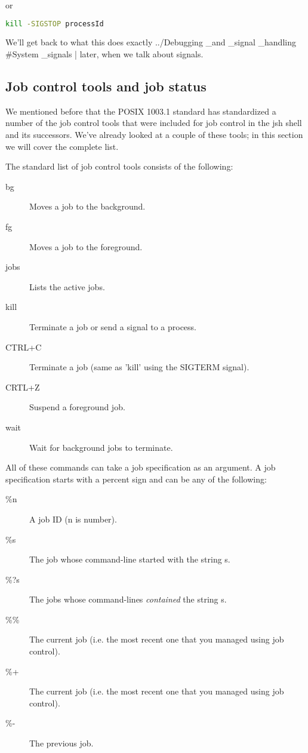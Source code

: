 or 
\lstset{basicstyle=\scriptsize, numbers=left, captionpos=b, tabsize=4}
\begin{lstlisting}[language={bash},
xleftmargin=15pt]
kill -SIGSTOP processId
\end{lstlisting}

We'll get back to what this does exactly
../Debugging \_and \_signal \_handling \#System \_signals | later, when we talk about
signals.

\subsection{Job control tools and job status}
We mentioned before that the POSIX 1003.1 standard has standardized a number of
the job control tools that were included for job control in the jsh shell and
its successors. We've already looked at a couple of these tools; in this
section we will cover the complete list.

The standard list of job control tools consists of the following:

\begin{description}
\item[bg]Moves a job to the background.
\item[fg]Moves a job to the foreground.
\item[jobs]Lists the active jobs.
\item[kill]Terminate a job or send a signal to a process.
\item[CTRL+C]Terminate a job (same as 'kill' using the SIGTERM signal).
\item[CRTL+Z]Suspend a foreground job.
\item[wait]Wait for background jobs to terminate.
\end{description}

All of these commands can take a job specification as an argument. A job
specification starts with a percent sign and can be any of the following:

\begin{description}
\item[\%n]A job ID (n is  number).
\item[\%s]The job whose command-line started with the string s.
\item[\%?s]The jobs whose command-lines \textit{contained} the string s.
\item[\%\%]The current job (i.e. the most recent one that you managed using job control).
\item[\%+]The current job (i.e. the most recent one that you managed using job control).
\item[\%-]The previous job.
\end{description}

